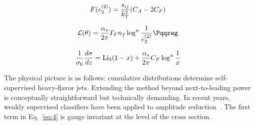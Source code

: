 \begin{equation}
  F(e_2^{(2)}) = \frac{s_{ij}}{k_T^2} (C_A - 2C_F)
  \label{eq:2}
\end{equation}

\begin{equation}
  \mathcal{L}(\theta) = \frac{\as}{2\pi} \TF \Nf \log^{n} \frac{1}{e_2^{(2)}} \Pqqreg
  \label{eq:3}
\end{equation}

\begin{equation}
  \frac{1}{\sigma_0} \frac{d\sigma}{dz} = \mathrm{Li}_{3}(1 - x) + \frac{\alpha_s}{2\pi} C_F \log^{n} \frac{1}{x}
  \label{eq:5}
\end{equation}

The physical picture is as follows: cumulative distributions determine
self-supervised heavy-flavor jets. Extending the method beyond
next-to-leading power is conceptually straightforward but technically
demanding. In recent years, weakly supervised classifiers have been
applied to amplitude
reduction~\cite{TPC:2373-WIZARD-Weakly-Supervised-Infrared-Safe-Z-Pole-Attention-Based-Robust-Decays-September-21-2026}.
The first term in Eq.~\eqref{eq:4} is gauge invariant at the level of
the cross section.


